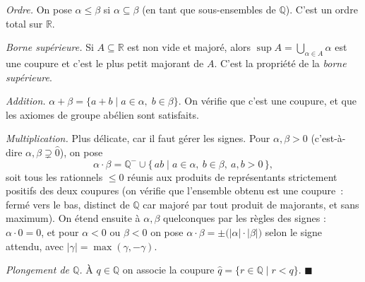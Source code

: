 \decsep{}


\begin{mdframed}[style=proofbar]
  \textit{Ordre.} On pose $\alpha \leq \beta$ si $\alpha \subseteq \beta$ (en tant que
  sous-ensembles de $\mathbb{Q}$). C'est un ordre total sur $\mathbb{R}$.

  \textit{Borne supérieure.} Si $A \subseteq \mathbb{R}$ est non vide et majoré,
  alors $\sup A = \bigcup_{\alpha \in A} \alpha$ est une coupure et c'est le plus
  petit majorant de $A$. C'est la propriété de la \emph{borne supérieure}.

  \textit{Addition.} $\alpha + \beta = \{a + b \mid a \in \alpha,\; b \in \beta\}$.
  On vérifie que c'est une coupure, et que les axiomes de groupe abélien sont satisfaits.

  \textit{Multiplication.} Plus délicate, car il faut gérer les signes.
  Pour $\alpha, \beta > 0$ (c'est-à-dire $\alpha, \beta \supsetneq \hat 0$), on pose
  \[
    \alpha \cdot \beta = \mathbb{Q}^- \cup \{\, ab \mid a \in \alpha,\ b \in \beta,\ a, b > 0 \,\},
  \]
  soit tous les rationnels $\leq 0$ réunis aux produits de représentants strictement
  positifs des deux coupures (on vérifie que l'ensemble obtenu est une coupure~:
  fermé vers le bas, distinct de $\mathbb{Q}$ car majoré par tout produit de
  majorants, et sans maximum). On étend ensuite à $\alpha, \beta$ quelconques par les règles des signes :
  $\alpha\cdot 0 = 0$, et pour $\alpha < 0$ ou $\beta < 0$ on pose
  $\alpha\cdot\beta = \pm\bigl(|\alpha|\cdot|\beta|\bigr)$ selon le signe attendu,
  avec $|\gamma| = \max(\gamma, -\gamma)$.

  \textit{Plongement de $\mathbb{Q}$.} À $q \in \mathbb{Q}$ on associe la coupure
  $\hat{q} = \{r \in \mathbb{Q} \mid r < q\}$. \hfill$\blacksquare$
\end{mdframed}

\decsep{}



